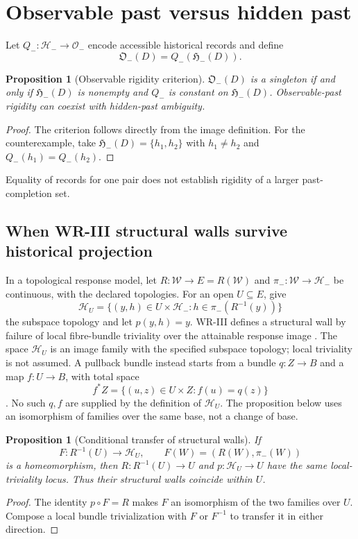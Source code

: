 \documentclass[11pt]{article}
\newtheorem{proposition}[definition]{Proposition}
\newcommand{\Wcal}{\mathcal W}
\newcommand{\Hminus}{\mathcal H_-}
\newcommand{\Pcal}{\mathfrak H_-}
\begin{document}
\section{Observable past versus hidden past}
Let $Q_-:\Hminus\to\mathcal O_-$ encode accessible historical records and define
\[
\mathfrak O_-(D)=Q_-(\Pcal(D)).
\]
\begin{proposition}[Observable rigidity criterion]
\label{prop:observable-rigidity}
$\mathfrak O_-(D)$ is a singleton if and only if $\Pcal(D)$ is
nonempty and $Q_-$ is constant on $\Pcal(D)$. Observable-past rigidity
can coexist with hidden-past ambiguity.
\end{proposition}
\begin{proof}
The criterion follows directly from the image definition. For the
counterexample, take $\Pcal(D)=\{h_1,h_2\}$ with $h_1\ne h_2$ and
$Q_-(h_1)=Q_-(h_2)$.
\end{proof}
Equality of records for one pair does not establish rigidity of a
larger past-completion set.


\subsection{When WR-III structural walls survive historical projection}

In a topological response model, let $R:\Wcal\to E=R(\Wcal)$
and $\pi_-:\Wcal\to\Hminus$ be continuous, with the declared
topologies. For an open $U\subseteq E$, give
\[
\mathcal H_U
=\{(y,h)\in U\times\Hminus:h\in\pi_-(R^{-1}(y))\}
\]
the subspace topology and let $p(y,h)=y$.
WR-III defines a structural wall by failure of local fibre-bundle
triviality over the attainable response image
\cite[Section 8]{WRIII}.
The space $\mathcal H_U$ is an image family with the specified
subspace topology; local triviality is not assumed. A pullback
bundle instead starts from a bundle $q:Z\to B$ and a map $f:U\to B$,
with total space
\[
f^*Z=\{(u,z)\in U\times Z:f(u)=q(z)\}
\]
\cite[Section 1.2]{SelickNotes}. No such $q,f$ are supplied by
the definition of $\mathcal H_U$. The proposition below uses an
isomorphism of families over the same base, not a change of base.

\begin{proposition}[Conditional transfer of structural walls]
\label{prop:wall-transfer}
If
\[
F:R^{-1}(U)\longrightarrow\mathcal H_U,
\qquad F(W)=(R(W),\pi_-(W))
\]
is a homeomorphism, then $R:R^{-1}(U)\to U$ and
$p:\mathcal H_U\to U$ have the same local-triviality locus.
Thus their structural walls coincide within $U$.
\end{proposition}
\begin{proof}
The identity $p\circ F=R$ makes $F$ an isomorphism of the two
families over $U$. Compose a local bundle trivialization with $F$
or $F^{-1}$ to transfer it in either direction.
\end{proof}
\end{document}
